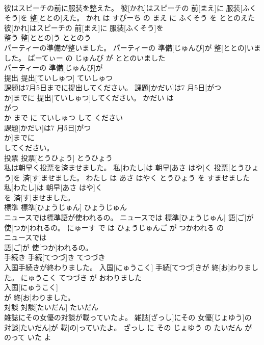 \documentclass[8pt]{extreport}
\begin{document}
\begin{CJK}{UTF8}{min}
\\	彼はスピーチの前に服装を整えた。	彼[かれ]はスピーチの 前[まえ]に 服装[ふくそう]を 整[ととの]えた。	かれ は すぴーち の まえ に ふくそう を ととのえた	
\\	彼[かれ]はスピーチの 前[まえ]に 服装[ふくそう]を
\\	整う	整[ととの]う	ととのう	
\\	パーティーの準備が整いました。	パーティーの 準備[じゅんび]が 整[ととの]いました。	ぱーてぃー の じゅんび が ととのいました	
\\	パーティーの 準備[じゅんび]が
\\	提出	提出[ていしゅつ]	ていしゅつ	
\\	課題は7月5日までに提出してください。	課題[かだい]は7 月5日[がつ 
\\	か]までに 提出[ていしゅつ]してください。	かだい は 
\\	がつ 
\\	か まで に ていしゅつ して ください	
\\	課題[かだい]は7 月5日[がつ 
\\	か]までに
\\	してください。			
\\	投票	投票[とうひょう]	とうひょう	
\\	私は朝早く投票を済ませました。	私[わたし]は 朝早[あさ はや]く 投票[とうひょう]を 済[す]ませました。	わたし は あさ はやく とうひょう を すませました	
\\	私[わたし]は 朝早[あさ はや]く
\\	を 済[す]ませました。			
\\	標準	標準[ひょうじゅん]	ひょうじゅん	
\\	ニュースでは標準語が使われるの。	ニュースでは 標準[ひょうじゅん] 語[ご]が 使[つか]われるの。	にゅーす で は ひょうじゅんご が つかわれる の	
\\	ニュースでは
\\	語[ご]が 使[つか]われるの。			
\\	手続き	手続[てつづ]き	てつづき	
\\	入国手続きが終わりました。	入国[にゅうこく] 手続[てつづ]きが 終[お]わりました。	にゅうこく てつづき が おわりました	
\\	入国[にゅうこく]
\\	が 終[お]わりました。			
\\	対談	対談[たいだん]	たいだん	
\\	雑誌にその女優の対談が載っていたよ。	雑誌[ざっし]にその 女優[じょゆう]の 対談[たいだん]が 載[の]っていたよ。	ざっし に その じょゆう の たいだん が のって いた よ	

\end{CJK}
\end{document}
